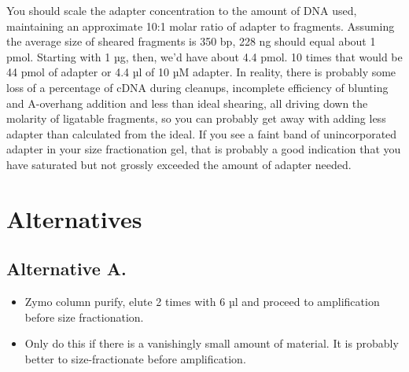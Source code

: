 \documentclass[
  letterpaper,
  DIV=11,
  numbers=noendperiod]{scrreprt}
\providecommand{\tightlist}{%
  \setlength{\itemsep}{0pt}\setlength{\parskip}{0pt}}\usepackage{longtable,booktabs,array}
\begin{document}
\begin{tcolorbox}[enhanced jigsaw, rightrule=.15mm, title=\textcolor{quarto-callout-warning-color}{\faExclamationTriangle}\hspace{0.5em}{NOTES}, titlerule=0mm, opacitybacktitle=0.6, toprule=.15mm, bottomrule=.15mm, opacityback=0, left=2mm, colframe=quarto-callout-warning-color-frame, breakable, coltitle=black, colback=white, colbacktitle=quarto-callout-warning-color!10!white, bottomtitle=1mm, leftrule=.75mm, toptitle=1mm, arc=.35mm]

You should scale the adapter concentration to the amount of DNA used,
maintaining an approximate 10:1 molar ratio of adapter to fragments.
Assuming the average size of sheared fragments is 350 bp, 228 ng should
equal about 1 pmol. Starting with 1 µg, then, we'd have about 4.4 pmol.
10 times that would be 44 pmol of adapter or 4.4 µl of 10 µM adapter. In
reality, there is probably some loss of a percentage of cDNA during
cleanups, incomplete efficiency of blunting and A-overhang addition and
less than ideal shearing, all driving down the molarity of ligatable
fragments, so you can probably get away with adding less adapter than
calculated from the ideal. If you see a faint band of unincorporated
adapter in your size fractionation gel, that is probably a good
indication that you have saturated but not grossly exceeded the amount
of adapter needed.

\end{tcolorbox}

\hypertarget{alternatives}{%
\section{Alternatives}\label{alternatives}}

\hypertarget{alternative-a.}{%
\subsection{Alternative A.}\label{alternative-a.}}

\begin{itemize}
\tightlist
\item
  Zymo column purify, elute 2 times with 6 µl and proceed to
  amplification before size fractionation.
\item
  Only do this if there is a vanishingly small amount of material. It is
  probably better to size-fractionate before amplification.
\end{itemize}
\end{document}
